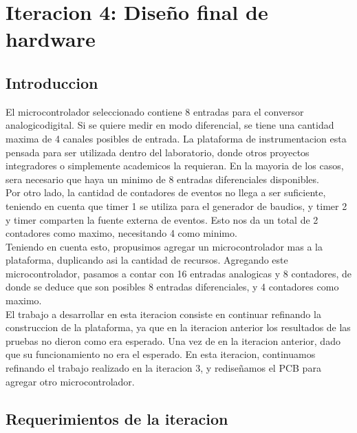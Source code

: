 \chapter{Iteracion 4: Diseño final de hardware} %
\label{cha:iteracion_4}

\section{Introduccion} %
\label{sec:introduccion}

El microcontrolador seleccionado contiene 8 entradas para el conversor analogico\-digital. Si se quiere medir en modo diferencial, se tiene una cantidad maxima de 4 canales posibles de entrada. La plataforma de instrumentacion esta pensada para ser utilizada dentro del laboratorio, donde otros proyectos integradores o simplemente academicos la requieran. En la mayoria de los casos, sera necesario que haya un minimo de 8 entradas diferenciales disponibles. \\

Por otro lado, la cantidad de contadores de eventos no llega a ser suficiente, teniendo en cuenta que timer 1 se utiliza para el generador de baudios, y timer 2 y timer comparten la fuente externa de eventos. Esto nos da un total de 2 contadores como maximo, necesitando 4 como minimo. \\

Teniendo en cuenta esto, propusimos agregar un microcontrolador mas a la plataforma, duplicando asi la cantidad de recursos. Agregando este microcontrolador, pasamos a contar con 16 entradas analogicas y 8 contadores, de donde se deduce que son posibles 8 entradas diferenciales, y 4 contadores como maximo. \\

El trabajo a desarrollar en esta iteracion consiste en continuar refinando la construccion de la plataforma, ya que en la iteracion anterior los resultados de las pruebas no dieron como era esperado. Una vez de en la iteracion anterior, dado que su funcionamiento no era el esperado. En esta iteracion, continuamos refinando el trabajo realizado en la iteracion 3, y rediseñamos el PCB para agregar otro microcontrolador.


\section{Requerimientos de la iteracion} %
\label{sec:requerimientos_de_la_iteracion}

